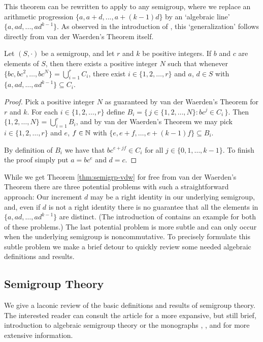 This theorem can be rewritten to apply to any semigroup, where we replace an arithmetic progression $\{a, a+d, ..., a+(k-1)d\}$ by an `algebraic line' $\{a, ad, ..., ad^{k-1}\}$. As observed in the introduction of \cite{Bergelson:1992fk}, this `generalization' follows directly from van der Waerden's Theorem itself. 

\begin{thm}
  \label{thm:semigrp-vdw}
  Let $(S, \cdot)$ be a semigroup, and let $r$ and $k$ be positive integers.
  If $b$ and $c$ are elements of $S$, then there exists a positive integer $N$ such that whenever $\{bc, bc^2, \ldots, bc^N\} = \bigcup_{i=1}^r C_i$, there exist $i \in \{1, 2, \ldots, r\}$ and $a$, $d \in S$ with $\{a, ad, \ldots, ad^{k-1}\} \subseteq C_i$.
\end{thm}
\begin{proof}
  Pick a positive integer $N$ as guaranteed by van der Waerden's Theorem for $r$ and $k$.
  For each $i \in \{1, 2, \ldots, r\}$ define $B_i = \bigl\{\, j \in \{1, 2, \ldots, N\} : bc^j \in C_i \,\bigr\}$.
  Then $\{1, 2, \ldots, N\} = \bigcup_{i=1}^r B_i$, and by van der Waerden's Theorem we may pick $i \in \{1, 2, \ldots, r\}$ and $e$, $f \in \mathbb{N}$ with $\{e, e+f, \ldots, e+(k-1)f\} \subseteq B_i$.
  
  By definition of $B_i$ we have that $bc^{e+jf} \in C_i$ for all $j \in \{0, 1, \ldots, k-1\}$.
  To finish the proof simply put $a = bc^e$ and $d = c$.
\end{proof}

While we get Theorem \ref{thm:semigrp-vdw} for free from van der Waerden's Theorem there are three potential problems with such a straightforward approach:
Our increment $d$ may be a right identity in our underlying semigroup, and, even if $d$ is not a right identity there is no guarantee that all the elements in $\{a, ad, \ldots, ad^{k-1}\}$ are distinct.
(The introduction of \cite{Bergelson:1992fk} contains an example for both of these problems.)
The last potential problem is more subtle and can only occur when the underlying semigroup is noncommutative.
To precisely formulate this subtle problem we make a brief detour to quickly review some needed algebraic definitions and results.

\subsection{Semigroup Theory}
We give a laconic review of the basic definitions and results of semigroup theory.
The interested reader can consult the article \cite{Hollings:2007uq} for a more expansive, but still brief, introduction to algebraic semigroup theory or the monographs \cite{Clifford:1961fk}, \cite{Clifford:1967fk}, and \cite[Chapter 1]{Hindman:1998fk} for more extensive information. 

